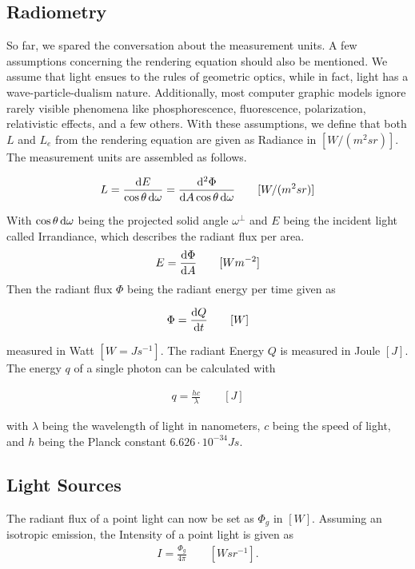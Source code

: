 \subsection{Radiometry}


So far, we spared the conversation about the measurement units. A few assumptions concerning the rendering equation should also be mentioned. We assume that light ensues to the rules of geometric optics, while in fact, light has a wave-particle-dualism nature. Additionally, most computer graphic models ignore rarely visible phenomena like phosphorescence, fluorescence, polarization, relativistic effects, and a few others. With these assumptions, we define that both $L$ and $L_e$ from the rendering equation are given as Radiance in $[W / (m^2sr)]$. The measurement units are assembled as follows.

\begin{align}
L = \frac{\mathop{}\!\mathrm{d} E}{\cos \theta \mathop{}\!\mathrm{d}\omega} = \frac{\mathop{}\!\mathrm{d}^2\Phi}{\mathop{}\!\mathrm{d} A\cos \theta \mathop{}\!\mathrm{d}\omega} \qquad [W / (m^2 sr) ]
\end{align}


With $\cos \theta \mathop{}\!\mathrm{d}\omega$ being the projected solid angle $\omega^\perp$ and $E$ being the incident light called Irrandiance, which describes the radiant flux per area.
\begin{align}
E = \frac{ \mathop{}\!\mathrm{d} \Phi }{ \mathop{}\!\mathrm{d} A } \qquad [W m^{-2} ]
\end{align}
Then the radiant flux $\Phi$ being the radiant energy per time given as

\begin{align}
 \Phi = \frac{\mathop{}\!\mathrm{d} Q}{\mathop{}\!\mathrm{d} t} \qquad [W]   
\end{align}

measured in Watt $[W = Js^{-1} ]$. The radiant Energy $Q$ is measured in Joule $[J]$. The energy $q$ of a single photon can be calculated with 

\begin{align}
 q = \frac{hc}{\lambda} \qquad [J]   
\end{align}

with $\lambda$ being the wavelength of light in nanometers, $c$ being the speed of light, and $h$ being the Planck constant $6.626 \cdot 10^{-34} Js$.

\subsection{Light Sources}


The radiant flux of a point light can now be set as $\Phi_g$ in $[W]$. Assuming an isotropic emission, the Intensity of a point light is given as
\begin{align}
 I = \frac{\Phi_g}{4\pi} \qquad [ W sr^{-1} ] .
\end{align}

